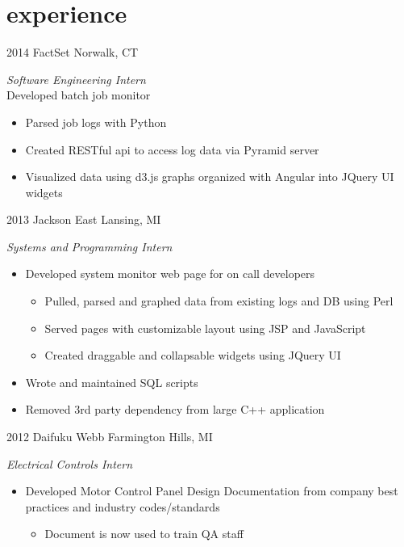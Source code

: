 \section{experience}

\begin{entrylist}
\entry
{2014}
{FactSet}
{Norwalk, CT}
{\emph{Software Engineering Intern}\\
Developed batch job monitor
\begin{itemize}
	\item Parsed job logs with Python
	\item Created RESTful api to access log data via Pyramid server
	\item Visualized data using d3.js graphs organized with Angular into JQuery UI widgets
\end{itemize}
}
\entry
{2013}
{Jackson}
{East Lansing, MI}
{\emph{Systems and Programming Intern}
\begin{itemize}
\item Developed system monitor web page for on call developers
	\begin{itemize}
		\item Pulled, parsed and graphed data from existing logs and DB using Perl
		\item Served pages with customizable layout using JSP and JavaScript
		\item Created draggable and collapsable widgets using JQuery UI
	\end{itemize}
\item Wrote and maintained SQL scripts
\item Removed 3rd party dependency from large C++ application
\end{itemize}
}
\entry
{2012}
{Daifuku Webb}
{Farmington Hills, MI}
{\emph{Electrical Controls Intern}
\begin{itemize}
	\item Developed Motor Control Panel Design Documentation from company best practices and industry codes/standards
		\begin{itemize}
			\item Document is now used to train QA staff
		\end{itemize}
\end{itemize}
}
\end{entrylist}
